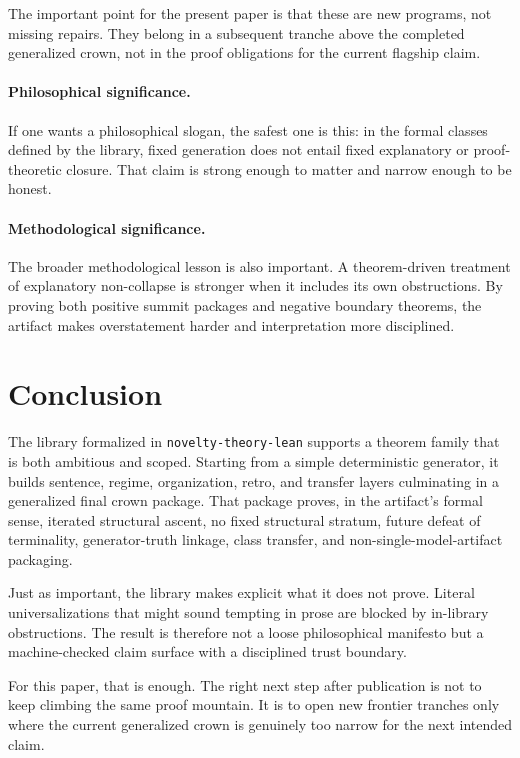 \documentclass[11pt,a4paper]{article}
\theoremstyle{definition}
\begin{document}
The important point for the present paper is that these are new programs, not missing repairs. They belong in a subsequent tranche above the completed generalized crown, not in the proof obligations for the current flagship claim.

\paragraph{Philosophical significance.}
If one wants a philosophical slogan, the safest one is this: in the formal classes defined by the library, fixed generation does not entail fixed explanatory or proof-theoretic closure. That claim is strong enough to matter and narrow enough to be honest.

\paragraph{Methodological significance.}
The broader methodological lesson is also important. A theorem-driven treatment of explanatory non-collapse is stronger when it includes its own obstructions. By proving both positive summit packages and negative boundary theorems, the artifact makes overstatement harder and interpretation more disciplined.

\section{Conclusion}\label{sec:conclusion}

The library formalized in \texttt{novelty-theory-lean} supports a theorem family that is both ambitious and scoped. Starting from a simple deterministic generator, it builds sentence, regime, organization, retro, and transfer layers culminating in a generalized final crown package. That package proves, in the artifact's formal sense, iterated structural ascent, no fixed structural stratum, future defeat of terminality, generator-truth linkage, class transfer, and non-single-model-artifact packaging.

Just as important, the library makes explicit what it does not prove. Literal universalizations that might sound tempting in prose are blocked by in-library obstructions. The result is therefore not a loose philosophical manifesto but a machine-checked claim surface with a disciplined trust boundary.

For this paper, that is enough. The right next step after publication is not to keep climbing the same proof mountain. It is to open new frontier tranches only where the current generalized crown is genuinely too narrow for the next intended claim.
\end{document}
